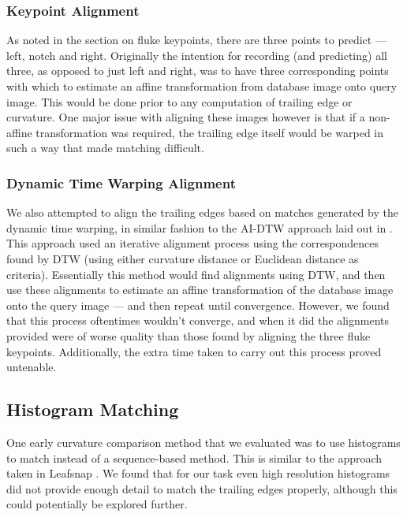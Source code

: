 \subsubsection{Keypoint Alignment}

As noted in the section on fluke keypoints, there are three points to predict --- left, notch and right.
Originally the intention for recording (and predicting) all three, as opposed to just left and right, was to have three corresponding points with which to estimate an affine transformation from database image onto query image.
This would be done prior to any computation of trailing edge or curvature.
One major issue with aligning these images however is that if a non-affine transformation was required, the trailing edge itself would be warped in such a way that made matching difficult.

\subsubsection{Dynamic Time Warping Alignment}

We also attempted to align the trailing edges based on matches generated by the dynamic time warping, in similar fashion to the AI-DTW approach laid out in \cite{qiao2006affine}.
This approach used an iterative alignment process using the correspondences found by DTW (using either curvature distance or Euclidean distance as criteria).
Essentially this method would find alignments using DTW, and then use these alignments to estimate an affine transformation of the database image onto the query image --- and then repeat until convergence.
However, we found that this process oftentimes wouldn't converge, and when it did the alignments provided were of worse quality than those found by aligning the three fluke keypoints.
Additionally, the extra time taken to carry out this process proved untenable.

\subsection{Histogram Matching}

One early curvature comparison method that we evaluated was to use histograms to match instead of a sequence-based method.
This is similar to the approach taken in Leafsnap \cite{kumar2012leafsnap}.
We found that for our task even high resolution histograms did not provide enough detail to match the trailing edges properly, although this could potentially be explored further.

